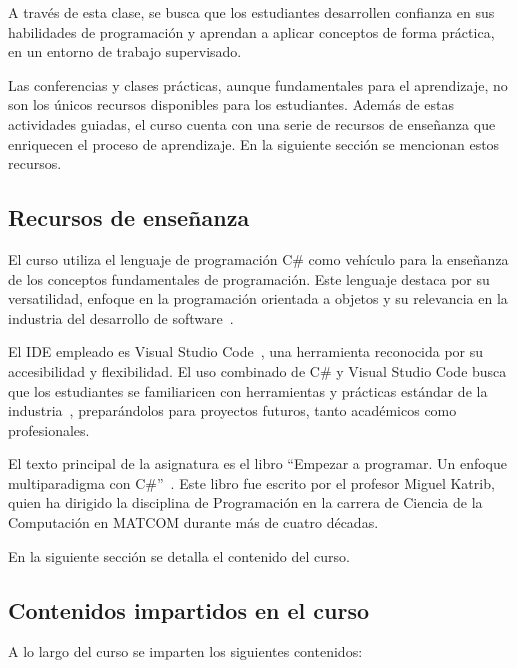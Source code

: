 A través de esta clase, se busca que los estudiantes desarrollen confianza en sus habilidades de programación y aprendan a aplicar conceptos de forma práctica, en un entorno de trabajo supervisado.

Las conferencias y clases prácticas, aunque fundamentales para el aprendizaje, no son los únicos recursos disponibles para los estudiantes. Además de estas actividades guiadas, el curso cuenta con una serie de recursos de enseñanza que enriquecen el proceso de aprendizaje. En la siguiente sección se mencionan estos recursos.

\subsection{Recursos de enseñanza}

El curso utiliza el lenguaje de programación C\# como vehículo para la enseñanza de los conceptos fundamentales de programación. Este lenguaje destaca por su versatilidad, enfoque en la programación orientada a objetos y su relevancia en la industria del desarrollo de software~\cite{microsoft-docs, Albahari2017, Troelsen2021}.

El IDE empleado es Visual Studio Code~\cite{vscode}, una herramienta reconocida por su accesibilidad y flexibilidad. El uso combinado de C\# y Visual Studio Code busca que los estudiantes se familiaricen con herramientas y prácticas estándar de la industria~\cite{microsoft-docs}, preparándolos para proyectos futuros, tanto académicos como profesionales.

El texto principal de la asignatura es el libro ``Empezar a programar. Un enfoque multiparadigma con C\#''~\cite{katrib_programar}. Este libro fue escrito por el profesor Miguel Katrib, quien ha dirigido la disciplina de Programación en la carrera de Ciencia de la Computación en \mbox{MATCOM} durante más de cuatro décadas.

En la siguiente sección se detalla el contenido del curso.

\subsection{Contenidos impartidos en el curso}  

A lo largo del curso se imparten los siguientes contenidos:

